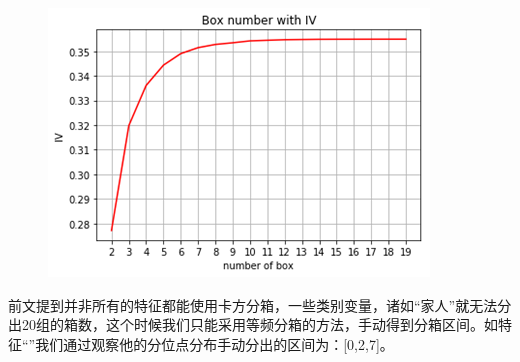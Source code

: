 \documentclass[12pt]{article}
\begin{document}
\begin{figure}[H]
	\centering
	\includegraphics[width=0.7\linewidth]{figures/screenshot004}
	\caption{}
\end{figure}

\newpage

\begin{flushleft}
	\noindent\qquad 前文提到并非所有的特征都能使用卡方分箱，一些类别变量，诸如“家人”就无法分出20组的箱数，这个时候我们只能采用等频分箱的方法，手动得到分箱区间。如特征“”我们通过观察他的分位点分布手动分出的区间为：[0,2,7]。
\end{flushleft}







\begin{figure}[H]
	\centering
	\quad

\end{figure}
\end{document}
